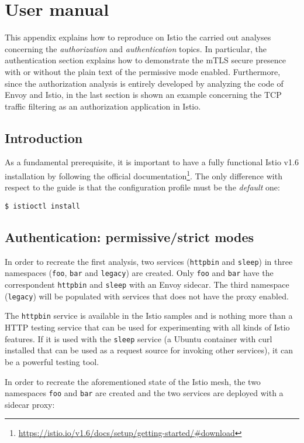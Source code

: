 \appendix
\chapter{User manual}
This appendix explains how to reproduce on Istio the carried out analyses concerning the \textit{authorization} and \textit{authentication} topics. In particular, the authentication section explains how to demonstrate the mTLS secure presence with or without the plain text of the permissive mode enabled. Furthermore, since the authorization analysis is entirely developed by analyzing the code of Envoy and Istio, in the last section is shown an example concerning the TCP traffic filtering as an authorization application in Istio.
\minitoc

\section{Introduction}
As a fundamental prerequisite, it is important to have a fully functional Istio v1.6 installation by following the official documentation\footnote{\url{https://istio.io/v1.6/docs/setup/getting-started/\#download}}. The only difference with respect to the guide is that the configuration profile must be the \textit{default} one:

\begin{lstlisting}
$ istioctl install
\end{lstlisting}


\section{Authentication: permissive/strict modes}
In order to recreate the first analysis, two services (\texttt{httpbin} and \texttt{sleep}) in three namespaces (\texttt{foo}, \texttt{bar} and \texttt{legacy}) are created. Only \texttt{foo} and \texttt{bar} have the correspondent \texttt{httpbin} and \texttt{sleep} with an Envoy sidecar. The third namespace (\texttt{legacy}) will be populated with services that does not have the proxy enabled.

The \texttt{httpbin} service is available in the Istio samples and is nothing more than a HTTP testing service that can be used for experimenting with all kinds of Istio features. If it is used with the \texttt{sleep} service (a Ubuntu container with curl installed that can be used as a request source for invoking other services), it can be a powerful testing tool.

In order to recreate the aforementioned state of the Istio mesh, the two namespaces \texttt{foo} and \texttt{bar} are created and the two services are deployed with a sidecar proxy:

